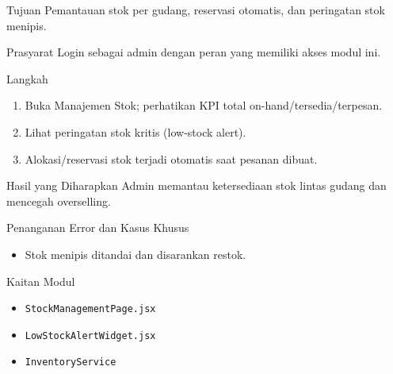 
\begin{flowsection}{Tujuan}
Pemantauan stok per gudang, reservasi otomatis, dan peringatan stok menipis.
\end{flowsection}

\begin{flowsection}{Prasyarat}
Login sebagai admin dengan peran yang memiliki akses modul ini.
\end{flowsection}

\begin{flowsection}{Langkah}
\begin{enumerate}
  \item Buka Manajemen Stok; perhatikan KPI total on-hand/tersedia/terpesan.
  \item Lihat peringatan stok kritis (low-stock alert).
  \item Alokasi/reservasi stok terjadi otomatis saat pesanan dibuat.
\end{enumerate}
\end{flowsection}


\begin{flowsection}{Hasil yang Diharapkan}
Admin memantau ketersediaan stok lintas gudang dan mencegah overselling.
\end{flowsection}

\begin{flowsection}{Penanganan Error dan Kasus Khusus}
\begin{itemize}
  \item Stok menipis ditandai dan disarankan restok.
\end{itemize}
\end{flowsection}

\begin{flowsection}{Kaitan Modul}
\begin{itemize}
  \item \texttt{StockManagementPage.jsx}
  \item \texttt{LowStockAlertWidget.jsx}
  \item \texttt{InventoryService}
\end{itemize}
\end{flowsection}

